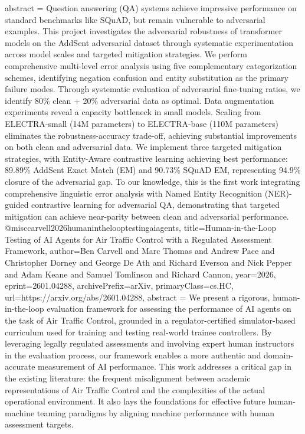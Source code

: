 {      abstract = {Question answering (QA) systems achieve impressive performance on standard benchmarks like SQuAD, but remain vulnerable to adversarial examples. This project investigates the adversarial robustness of transformer models on the AddSent adversarial dataset through systematic experimentation across model scales and targeted mitigation strategies. We perform comprehensive multi-level error analysis using five complementary categorization schemes, identifying negation confusion and entity substitution as the primary failure modes. Through systematic evaluation of adversarial fine-tuning ratios, we identify 80\% clean + 20\% adversarial data as optimal. Data augmentation experiments reveal a capacity bottleneck in small models. Scaling from ELECTRA-small (14M parameters) to ELECTRA-base (110M parameters) eliminates the robustness-accuracy trade-off, achieving substantial improvements on both clean and adversarial data. We implement three targeted mitigation strategies, with Entity-Aware contrastive learning achieving best performance: 89.89\% AddSent Exact Match (EM) and 90.73\% SQuAD EM, representing 94.9\% closure of the adversarial gap. To our knowledge, this is the first work integrating comprehensive linguistic error analysis with Named Entity Recognition (NER)-guided contrastive learning for adversarial QA, demonstrating that targeted mitigation can achieve near-parity between clean and adversarial performance.}
}@misc{carvell2026humaninthelooptestingaiagents,
      title={Human-in-the-Loop Testing of AI Agents for Air Traffic Control with a Regulated Assessment Framework}, 
      author={Ben Carvell and Marc Thomas and Andrew Pace and Christopher Dorney and George De Ath and Richard Everson and Nick Pepper and Adam Keane and Samuel Tomlinson and Richard Cannon},
      year={2026},
      eprint={2601.04288},
      archivePrefix={arXiv},
      primaryClass={cs.HC},
      url={https://arxiv.org/abs/2601.04288},
      abstract = {We present a rigorous, human-in-the-loop evaluation framework for assessing the performance of AI agents on the task of Air Traffic Control, grounded in a regulator-certified simulator-based curriculum used for training and testing real-world trainee controllers. By leveraging legally regulated assessments and involving expert human instructors in the evaluation process, our framework enables a more authentic and domain-accurate measurement of AI performance. This work addresses a critical gap in the existing literature: the frequent misalignment between academic representations of Air Traffic Control and the complexities of the actual operational environment. It also lays the foundations for effective future human-machine teaming paradigms by aligning machine performance with human assessment targets.}
}
